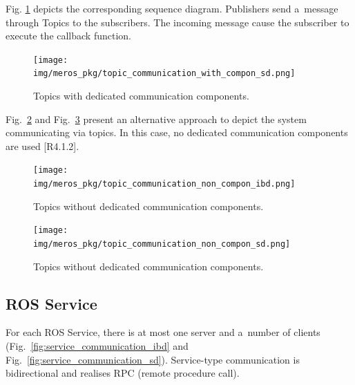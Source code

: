 \documentclass[11pt,oneside,a4paper]{report}
\begin{document}
	\pagebreak
	
	Fig. \ref{fig:topic_communication_with_dedicated_component_sd} depicts the corresponding sequence diagram. Publishers send a~message through Topics to the subscribers. The incoming message cause the subscriber to execute the callback function. 
	
	\begin{figure}[H]
		\centering
		\begin{center}
			{\texttt{[image: img/meros\_pkg/topic\_communication\_with\_compon\_sd.png]}}
		\end{center}
		\caption{Topics with dedicated communication components.} 
		\label{fig:topic_communication_with_dedicated_component_sd}
	\end{figure}
		
	
	Fig.~\ref{fig:topic_communication_without_dedicated_component_ibd} and Fig.~\ref{fig:topic_communication_without_dedicated_component_sd} present an alternative approach to depict the system communicating via topics. In this case, no dedicated communication components are used [R4.1.2]. 
	
	
	\begin{figure}[H]
		\centering
		\begin{center}
			{\texttt{[image: img/meros\_pkg/topic\_communication\_non\_compon\_ibd.png]}}
		\end{center}
		\caption{Topics without dedicated communication components.} 
		\label{fig:topic_communication_without_dedicated_component_ibd}
	\end{figure}
	
	\begin{figure}[H]
		\centering
		\begin{center}
			{\texttt{[image: img/meros\_pkg/topic\_communication\_non\_compon\_sd.png]}}
		\end{center}
		\caption{Topics without dedicated communication components.} 
		\label{fig:topic_communication_without_dedicated_component_sd}
	\end{figure}
	
	
	\pagebreak
	
	
\subsection{ROS Service}
\label{ch:metamodel-service}
	
	For each ROS Service, there is at most one server and a~number of clients (Fig.~\ref{fig:service_communication_ibd} and Fig.~\ref{fig:service_communication_sd}). Service-type communication is bidirectional and realises RPC (remote procedure call).
	
\end{document}
